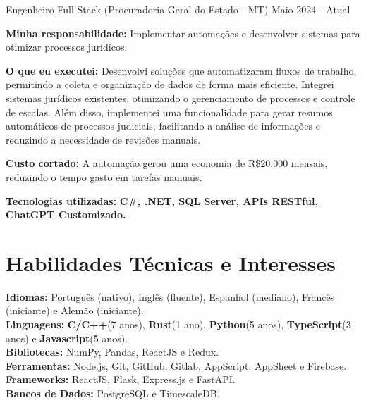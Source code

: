 \vspace{-2mm}

\resumeSubheading
{ Engenheiro Full Stack \textmd{(Procuradoria Geral do Estado - MT)}}{}
{}{Maio 2024 - Atual}
\vspace{-2.0mm}
\resumeItemListStart
\item \textbf{Minha responsabilidade:} Implementar automações e desenvolver sistemas para otimizar processos jurídicos.
\item \textbf{O que eu executei:} Desenvolvi soluções que automatizaram fluxos de trabalho, permitindo a coleta e organização de dados de forma mais eficiente. Integrei sistemas jurídicos existentes, otimizando o gerenciamento de processos e controle de escalas. Além disso, implementei uma funcionalidade para gerar resumos automáticos de processos judiciais, facilitando a análise de informações e reduzindo a necessidade de revisões manuais.
\item \textbf{Custo cortado:} A automação gerou uma economia de R\$20.000 mensais, reduzindo o tempo gasto em tarefas manuais.
\item \textbf{Tecnologias utilizadas:} \textbf{C\#, .NET, SQL Server, APIs RESTful, ChatGPT Customizado.}
\resumeItemListEnd

\vspace{-5.5mm}
\resumeSubHeadingListEnd

\section{\textbf{Habilidades Técnicas e Interesses}}
\begin{itemize}[leftmargin=0.05in, label={}]
    \small{\item{
          \textbf{Idiomas:}{ Português (nativo), Inglês (fluente), Espanhol (mediano), Francês (iniciante) e Alemão (iniciante).} \\
          \textbf{Linguagens:}{ \textbf{C/C++}(7 anos), \textbf{Rust}(1 ano), \textbf{Python}(5 anos), \textbf{TypeScript}(3 anos) e \textbf{Javascript}(5 anos). } \\
          \textbf{Bibliotecas:}{ NumPy, Pandas, ReactJS e Redux. }\\
          \textbf{Ferramentas:}{ Node.js, Git, GitHub,  Gitlab, AppScript, AppSheet e Firebase.} \\
          \textbf{Frameworks:}{ ReactJS, Flask, Express.js e FastAPI. } \\
          \textbf{Bancos de Dados:}{ PostgreSQL e TimescaleDB. } \\
          }}
\end{itemize}


